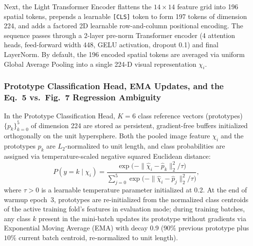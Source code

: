 \documentclass[conference]{IEEEtran}
\begin{document}
Next, the Light Transformer Encoder flattens the $14 \times 14$ feature grid
into 196 spatial tokens, prepends a learnable \texttt{[CLS]} token to form 197
tokens of dimension 224, and adds a factored 2D learnable row-and-column
positional encoding. The sequence passes through a 2-layer pre-norm Transformer
encoder (4 attention heads, feed-forward width 448, GELU activation, dropout
0.1) and final LayerNorm. By default, the 196 encoded spatial tokens are
averaged via uniform Global Average Pooling into a single 224-D visual
representation $\chi_i$.

\subsubsection{
  Prototype Classification Head, EMA Updates, and the Eq.~5 vs.\ Fig.~7
  Regression Ambiguity
}

In the Prototype Classification Head, $K = 6$ class reference vectors
(prototypes) $\{p_k\}_{k=0}^5$ of dimension 224 are stored as persistent,
gradient-free buffers initialized orthogonally on the unit hypersphere. Both the
pooled image feature $\chi_i$ and the prototypes $p_k$ are $L_2$-normalized to
unit length, and class probabilities are assigned via temperature-scaled
negative squared Euclidean distance:
\begin{equation}
  P(y = k \mid \chi_i) = \frac{\exp\!\big( -\|\hat{\chi}_i - \hat{p}_k\|_2^2 / \tau \big)}{\sum_{j=0}^{5} \exp\!\big( -\|\hat{\chi}_i - \hat{p}_j\|_2^2 / \tau \big)}, \label{eq:proto_softmax}
\end{equation}
where $\tau > 0$ is a learnable temperature parameter initialized at 0.2. At the
end of warmup epoch~3, prototypes are re-initialized from the normalized class
centroids of the active training fold's features in evaluation mode; during
training batches, any class $k$ present in the mini-batch updates its prototype
without gradients via Exponential Moving Average (EMA) with decay 0.9 ($90\%$
previous prototype plus $10\%$ current batch centroid, re-normalized to unit
length).
\end{document}
